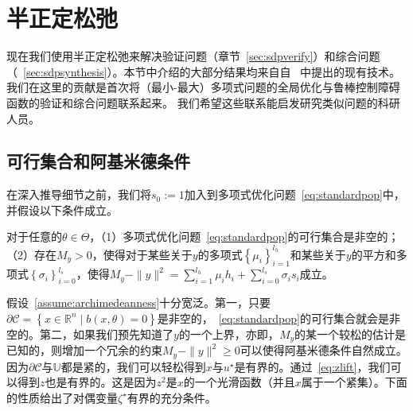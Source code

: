 
\chapter{半正定松弛}
\label{sec:sdprelax}

现在我们使用半正定松弛来解决验证问题（章节~\ref{sec:sdpverify}）和综合问题（~\ref{sec:sdpsynthesis}）。本节中介绍的大部分结果均来自自~\cite{lasserre01siopt-global,lasserre11jgo-minmaxpop} 中提出的现有技术。 我们在这里的贡献是首次将（最小-最大）多项式问题的全局优化与鲁棒控制障碍函数的验证和综合问题联系起来。 我们希望这些联系能启发研究类似问题的科研人员。

\section{可行集合和阿基米德条件}
在深入推导细节之前，我们将$s_0 := 1$加入到多项式优化问题~\eqref{eq:standardpop}中，并假设以下条件成立。
\begin{assumption}[可行性和阿基米德条件]\label{assume:archimedeanness}
    对于任意的$\theta \in \Theta$，（1）多项式优化问题~\eqref{eq:standardpop}的可行集合是非空的；（2）存在$M_y > 0$，使得对于某些关于$y$的多项式$\left\{ \mu_i \right\}_{i=1}^{l_h}$和某些关于$y$的平方和多项式$\left\{ \sigma_i \right\}_{i=0}^{l_s}$，使得$M_y - \parallel y \parallel^2 = \sum_{i=1}^{l_h} \mu_i h_i + \sum_{i=0}^{l_s} \sigma_i s_i$成立。
\end{assumption}

假设~\ref{assume:archimedeanness}十分宽泛。第一，只要$\partial \mathcal{C} = \left\{ x \in \mathbb{R}^n \mid b(x, \theta) = 0 \right\}$是非空的，~\eqref{eq:standardpop}的可行集合就会是非空的。第二，如果我们预先知道了$y$的一个上界，亦即，$M_y$的某一个较松的估计是已知的，则增加一个冗余的约束$M_y - \parallel y \parallel^2 \ge 0$可以使得阿基米德条件自然成立。因为$\partial \mathcal{C}$与$\mathbb{U}$都是紧的，我们可以轻松得到$x$与$u^\star$是有界的。通过~\eqref{eq:zlift}，我们可以得到$z$也是有界的。这是因为$z^2$是$x$的一个光滑函数（并且$x$属于一个紧集）。下面的性质给出了对偶变量$\zeta^\star$有界的充分条件。

